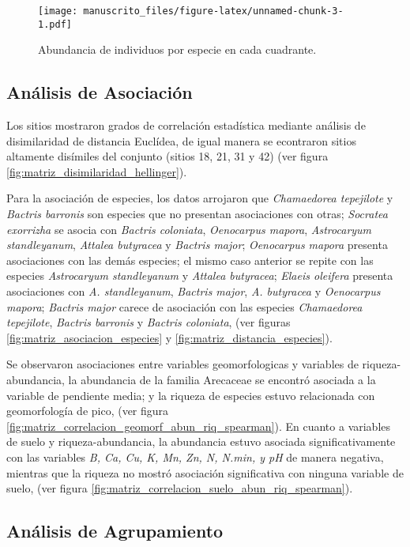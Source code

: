 \documentclass[11pt,]{article}
\begin{document}
\begin{figure}
\centering
\texttt{[image: manuscrito\_files/figure-latex/unnamed-chunk-3-1.pdf]}
\caption{\label{fig:abun_sp_q}Abundancia de individuos por especie en
cada cuadrante.}
\end{figure}

\subsection{Análisis de Asociación}\label{anuxe1lisis-de-asociaciuxf3n}

Los sitios mostraron grados de correlación estadística mediante análisis
de disimilaridad de distancia Euclídea, de igual manera se econtraron
sitios altamente disímiles del conjunto (sitios 18, 21, 31 y 42) (ver
figura \ref{fig:matriz_disimilaridad_hellinger}).

Para la asociación de especies, los datos arrojaron que
\emph{Chamaedorea tepejilote} y \emph{Bactris barronis} son especies que
no presentan asociaciones con otras; \emph{Socratea exorrizha} se asocia
con \emph{Bactris coloniata}, \emph{Oenocarpus mapora},
\emph{Astrocaryum standleyanum}, \emph{Attalea butyracea} y
\emph{Bactris major}; \emph{Oenocarpus mapora} presenta asociaciones con
las demás especies; el mismo caso anterior se repite con las especies
\emph{Astrocaryum standleyanum} y \emph{Attalea butyracea}; \emph{Elaeis
oleifera} presenta asociaciones con \emph{A. standleyanum},
\emph{Bactris major}, \emph{A. butyracea} y \emph{Oenocarpus mapora};
\emph{Bactris major} carece de asociación con las especies
\emph{Chamaedorea tepejilote}, \emph{Bactris barronis} y \emph{Bactris
coloniata}, (ver figuras \ref{fig:matriz_asociacion_especies} y
\ref{fig:matriz_distancia_especies}).

Se observaron asociaciones entre variables geomorfologicas y variables
de riqueza-abundancia, la abundancia de la familia Arecaceae se encontró
asociada a la variable de pendiente media; y la riqueza de especies
estuvo relacionada con geomorfología de pico, (ver figura
\ref{fig:matriz_correlacion_geomorf_abun_riq_spearman}). En cuanto a
variables de suelo y riqueza-abundancia, la abundancia estuvo asociada
significativamente con las variables \emph{B, Ca, Cu, K, Mn, Zn, N,
N.min, y pH} de manera negativa, mientras que la riqueza no mostró
asociación significativa con ninguna variable de suelo, (ver figura
\ref{fig:matriz_correlacion_suelo_abun_riq_spearman}).

\subsection{Análisis de
Agrupamiento}\label{anuxe1lisis-de-agrupamiento-1}
\end{document}
